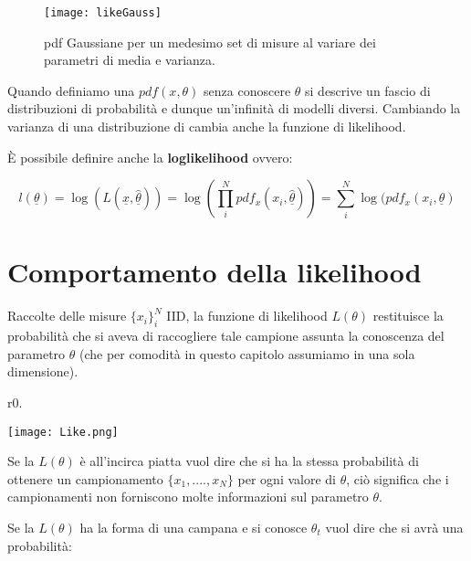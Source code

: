 
\begin{figure}[ht]
\vspace{0.2in}
\texttt{[image: likeGauss]}	
\centering
\vspace{0.2in}
\caption{pdf Gaussiane per un medesimo set di misure al variare dei parametri di media e varianza.}
\end{figure}
\noindent Quando definiamo una $pdf(x,\theta)$ senza conoscere $\theta$ si descrive un fascio di distribuzioni di probabilit\`{a} e dunque un'infinit\`{a} di modelli diversi. Cambiando la varianza di una distribuzione di cambia anche la funzione di likelihood.\newline

\noindent \`{E} possibile definire anche la \textbf{loglikelihood} ovvero:

\begin{equation*}
	 l(\underline{\theta})= \log(L(\underline{x},\underline{\hat{\theta}})) = \log(\prod_{i}^N pdf_{x}(x_i,\underline{\hat{\theta}})) = \sum_{i}^N \log(pdf_{x}(x_{i},\underline{\theta})
\end{equation*}

\section{Comportamento della likelihood}

\noindent Raccolte delle misure $\{x_{i}\}_i^N$ IID, la funzione di likelihood $L(\theta)$ restituisce la probabilit\`{a} che si aveva di raccogliere tale campione assunta la conoscenza del parametro $\theta$  (che per comodit\`{a} in questo capitolo assumiamo in una sola dimensione). 
\hspace{0.5in}

\begin{wrapfigure}{r}{0.\textwidth}
\centering

\texttt{[image: Like.png]}	

\end{wrapfigure}

\noindent Se la $L(\theta)$ \`{e} all'incirca piatta vuol dire che  si ha la stessa probabilit\`{a} di ottenere un campionamento $\{x_1,....,x_N\}$ per ogni valore di $\theta$, ci\`{o} significa che i campionamenti non forniscono molte informazioni sul parametro $\theta$.  

\hspace{0.5in}


Se la $L(\theta)$ ha la forma di una campana e si conosce $\theta_t$ vuol dire che si avr\`{a} una probabilit\`{a}:


